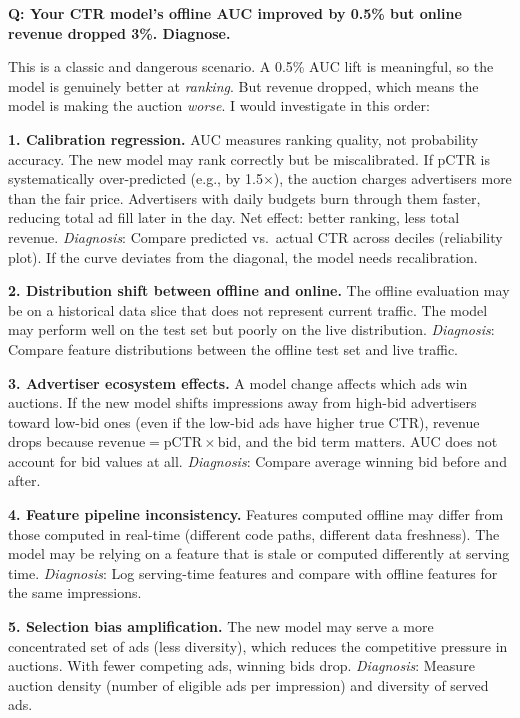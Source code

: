 \begin{interviewq}
\textbf{Q: Your CTR model's offline AUC improved by 0.5\% but online revenue dropped 3\%. Diagnose.}

 \quad {} \quad \badgefreq{\freqhigh}

\stronganswer

This is a classic and dangerous scenario. A 0.5\% AUC lift is meaningful, so the model is genuinely better at \textit{ranking}. But revenue dropped, which means the model is making the auction \textit{worse}. I would investigate in this order:

\textbf{1. Calibration regression.} AUC measures ranking quality, not probability accuracy. The new model may rank correctly but be miscalibrated. If pCTR is systematically over-predicted (e.g., by 1.5$\times$), the auction charges advertisers more than the fair price. Advertisers with daily budgets burn through them faster, reducing total ad fill later in the day. Net effect: better ranking, less total revenue. \textit{Diagnosis}: Compare predicted vs.\ actual CTR across deciles (reliability plot). If the curve deviates from the diagonal, the model needs recalibration.

\textbf{2. Distribution shift between offline and online.} The offline evaluation may be on a historical data slice that does not represent current traffic. The model may perform well on the test set but poorly on the live distribution. \textit{Diagnosis}: Compare feature distributions between the offline test set and live traffic.

\textbf{3. Advertiser ecosystem effects.} A model change affects which ads win auctions. If the new model shifts impressions away from high-bid advertisers toward low-bid ones (even if the low-bid ads have higher true CTR), revenue drops because $\text{revenue} = \text{pCTR} \times \text{bid}$, and the bid term matters. AUC does not account for bid values at all. \textit{Diagnosis}: Compare average winning bid before and after.

\textbf{4. Feature pipeline inconsistency.} Features computed offline may differ from those computed in real-time (different code paths, different data freshness). The model may be relying on a feature that is stale or computed differently at serving time. \textit{Diagnosis}: Log serving-time features and compare with offline features for the same impressions.

\textbf{5. Selection bias amplification.} The new model may serve a more concentrated set of ads (less diversity), which reduces the competitive pressure in auctions. With fewer competing ads, winning bids drop. \textit{Diagnosis}: Measure auction density (number of eligible ads per impression) and diversity of served ads.


\end{interviewq}
